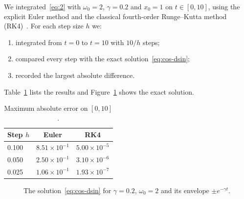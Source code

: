 \documentclass[11pt,a4paper]{article}
\begin{document}
We integrated~\eqref{eq:2} with $\omega_{0}=2$, $\gamma=0.2$ and $x_{0}=1$ on $t\in[0,10]$, using the explicit Euler method and the classical fourth-order Runge--Kutta method (RK4)~\cite{ref2}. For each step size $h$ we:
\begin{enumerate}
  \item integrated from $t=0$ to $t=10$ with $10/h$ steps;
  \item compared every step with the exact solution~\eqref{eq:cos-dsin};
  \item recorded the largest absolute difference.
\end{enumerate}
Table~\ref{tab:maximum-absolute} lists the results and Figure~\ref{fig:the-solution} shows the exact solution.

\begin{table}[htbp]
  \centering
  \caption{Maximum absolute error on $[0,10]$.}
  \label{tab:maximum-absolute}
  \begin{tabular}{lcc}
    \toprule
    \textbf{Step $h$} & \textbf{Euler} & \textbf{RK4} \\
    \midrule
    0.100 & $8.51\times10^{-1}$ & $5.00\times10^{-5}$ \\
    0.050 & $2.50\times10^{-1}$ & $3.10\times10^{-6}$ \\
    0.025 & $1.06\times10^{-1}$ & $1.93\times10^{-7}$ \\
    \bottomrule
  \end{tabular}
\end{table}

\begin{figure}[htbp]
  \centering
  \caption{The solution~\eqref{eq:cos-dsin} for $\gamma=0.2$, $\omega_{0}=2$ and its envelope $\pm e^{-\gamma t}$.}
  \label{fig:the-solution}
\end{figure}
\end{document}
